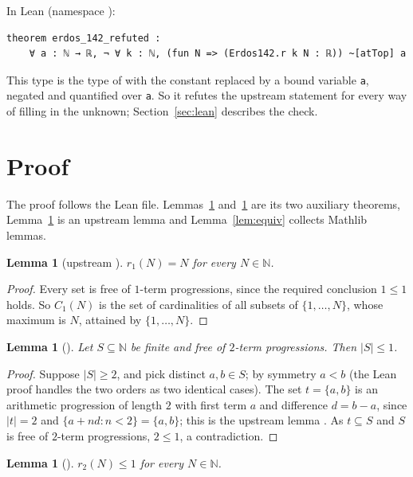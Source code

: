 \documentclass[11pt]{amsart}
\theoremstyle{plain}
\newtheorem{lemma}[theorem]{Lemma}
\theoremstyle{definition}
\newcommand{\N}{\mathbb{N}}
\begin{document}
In Lean (namespace ):
\begin{lstlisting}
theorem erdos_142_refuted :
    ∀ a : ℕ → ℝ, ¬ ∀ k : ℕ, (fun N => (Erdos142.r k N : ℝ)) ~[atTop] a
\end{lstlisting}
This type is the type of  with the constant  replaced by a bound variable \texttt{a}, negated and quantified over \texttt{a}. So it refutes the upstream statement for every way of filling in the unknown; Section~\ref{sec:lean} describes the check.

\section{Proof}\label{sec:proof}

The proof follows the Lean file. Lemmas~\ref{lem:free2} and~\ref{lem:r2} are its two auxiliary theorems, Lemma~\ref{lem:r1} is an upstream lemma and Lemma~\ref{lem:equiv} collects Mathlib lemmas.

\begin{lemma}[upstream ]\label{lem:r1}
$r_1(N)=N$ for every $N\in\N$.
\end{lemma}

\begin{proof}
Every set is free of $1$-term progressions, since the required conclusion $1\le 1$ holds. So $C_1(N)$ is the set of cardinalities of all subsets of $\{1,\dots,N\}$, whose maximum is $N$, attained by $\{1,\dots,N\}$.
\end{proof}

\begin{lemma}[]\label{lem:free2}
Let $S\subseteq\N$ be finite and free of $2$-term progressions. Then $|S|\le 1$.
\end{lemma}

\begin{proof}
Suppose $|S|\ge 2$, and pick distinct $a,b\in S$; by symmetry $a<b$ (the Lean proof handles the two orders as two identical cases). The set $t=\{a,b\}$ is an arithmetic progression of length $2$ with first term $a$ and difference $d=b-a$, since $|t|=2$ and $\{a+nd: n<2\}=\{a,b\}$; this is the upstream lemma . As $t\subseteq S$ and $S$ is free of $2$-term progressions, $2\le 1$, a contradiction.
\end{proof}

\begin{lemma}[]\label{lem:r2}
$r_2(N)\le 1$ for every $N\in\N$.
\end{lemma}
\end{document}
